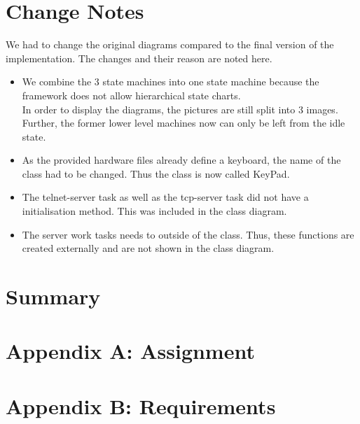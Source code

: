 \documentclass[a4paper,12pt,twoside]{scrreprt}
\begin{document}
\chapter{Change Notes}
\label{chap:ChangeNotes}
We had to change the original diagrams compared to the final version of the implementation. The changes and their reason are noted here. 

\begin{itemize}
	\item We combine the 3 state machines into one state machine because the framework does not allow hierarchical state charts. \\
	In order to display the diagrams, the pictures are still split into 3 images. Further, the former lower level machines now can only be left from the idle state. 
	\item As the provided hardware files already define a keyboard, the name of the class had to be changed. Thus the class is now called KeyPad.
	\item The telnet-server task as well as the tcp-server task did not have a initialisation method. This was included in the class diagram. 
	\item The server work tasks needs to outside of the class. Thus, these functions are created externally and are not shown in the class diagram. 
\end{itemize}
 
\chapter{Summary}
\label{chap:Summary}


%
%

\chapter*{Appendix A: Assignment}  %
\label{chap:AppendixAAssignment}



\chapter*{Appendix B: Requirements}  %
\label{chap:AppendixBRequirements}

\end{document}
